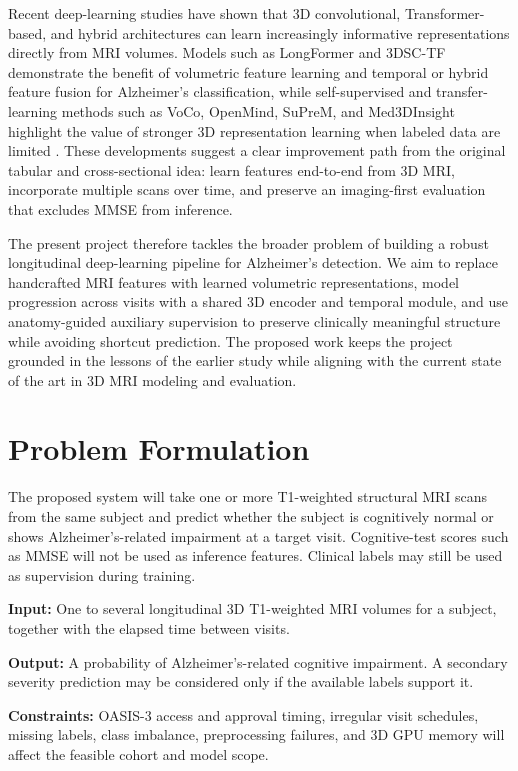 \documentclass[11pt]{article}
\begin{document}
Recent deep-learning studies have shown that 3D convolutional, Transformer-based, and hybrid architectures can learn increasingly informative representations directly from MRI volumes. Models such as LongFormer \cite{chen2024longformer} and 3DSC-TF \cite{qiang2025three} demonstrate the benefit of volumetric feature learning and temporal or hybrid feature fusion for Alzheimer's classification, while self-supervised and transfer-learning methods such as VoCo, OpenMind, SuPreM, and Med3DInsight highlight the value of stronger 3D representation learning when labeled data are limited \cite{wu2024voco,openmind2024,suprem2024,med3dinsight2025}. These developments suggest a clear improvement path from the original tabular and cross-sectional idea: learn features end-to-end from 3D MRI, incorporate multiple scans over time, and preserve an imaging-first evaluation that excludes MMSE from inference.

The present project therefore tackles the broader problem of building a robust longitudinal deep-learning pipeline for Alzheimer's detection. We aim to replace handcrafted MRI features with learned volumetric representations, model progression across visits with a shared 3D encoder and temporal module, and use anatomy-guided auxiliary supervision to preserve clinically meaningful structure while avoiding shortcut prediction. The proposed work keeps the project grounded in the lessons of the earlier study while aligning with the current state of the art in 3D MRI modeling and evaluation.


\section{Problem Formulation}

The proposed system will take one or more T1-weighted structural MRI scans from the same subject and predict whether the subject is cognitively normal or shows Alzheimer's-related impairment at a target visit. Cognitive-test scores such as MMSE will not be used as inference features. Clinical labels may still be used as supervision during training.

\textbf{Input:} One to several longitudinal 3D T1-weighted MRI volumes for a subject, together with the elapsed time between visits.

\textbf{Output:} A probability of Alzheimer's-related cognitive impairment. A secondary severity prediction may be considered only if the available labels support it.

\textbf{Constraints:} OASIS-3 access and approval timing, irregular visit schedules, missing labels, class imbalance, preprocessing failures, and 3D GPU memory will affect the feasible cohort and model scope.
\end{document}
